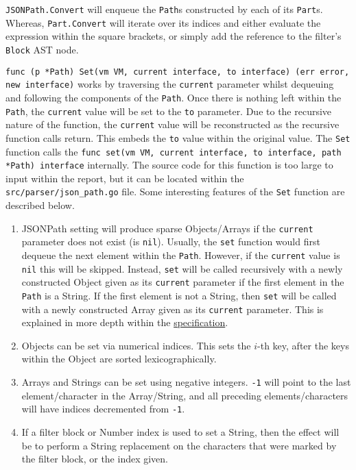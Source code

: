 \inputminted[firstline=529, lastline=581, autogobble, breaklines, tabsize=4]{go}{../../src/parser/json_path.go}

\verb|JSONPath.Convert| will enqueue the \verb|Path|s constructed by each of its \verb|Part|s. Whereas, \verb|Part.Convert| will iterate over its indices and either evaluate the expression within the square brackets, or simply add the reference to the filter's \verb|Block| AST node.

\texttt{func (p *Path) Set(vm VM, current interface{}, to interface{}) (err error, new interface{})} works by traversing the \verb|current| parameter whilst dequeuing and following the components of the \verb|Path|. Once there is nothing left within the \verb|Path|, the \verb|current| value will be set to the \verb|to| parameter. Due to the recursive nature of the function, the \verb|current| value will be reconstructed as the recursive function calls return. This embeds the \verb|to| value within the original value. The \verb|Set| function calls the \texttt{func set(vm VM, current interface{}, to interface{}, path *Path) interface{}} internally. The source code for this function is too large to input within the report, but it can be located within the \verb|src/parser/json_path.go| file. Some interesting features of the \verb|Set| function are described below.

\begin{enumerate}
    \item JSONPath setting will produce sparse Objects/Arrays if the \verb|current| parameter does not exist (is \verb|nil|). Usually, the \verb|set| function would first dequeue the next element within the \verb|Path|. However, if the \verb|current| value is \verb|nil| this will be skipped. Instead, \verb|set| will be called recursively with a newly constructed Object given as its \verb|current| parameter if the first element in the \verb|Path| is a String. If the first element is not a String, then \verb|set| will be called with a newly constructed Array given as its \verb|current| parameter. This is explained in more depth within the \hyperref[sec:jsonpath-setting]{specification}.
    \item Objects can be set via numerical indices. This sets the $i$-th key, after the keys within the Object are sorted lexicographically.
    \item Arrays and Strings can be set using negative integers. \verb|-1| will point to the last element/character in the Array/String, and all preceding elements/characters will have indices decremented from \verb|-1|.
    \item If a filter block or Number index is used to set a String, then the effect will be to perform a String replacement on the characters that were marked by the filter block, or the index given.
\end{enumerate}

